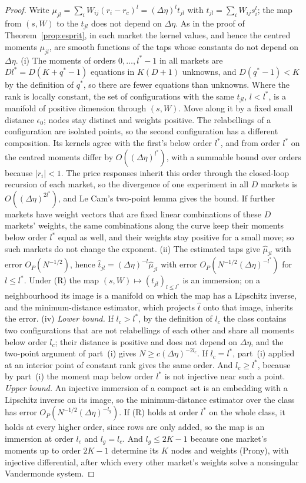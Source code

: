 \begin{proof}
Write $\mu_{jl}=\sum_iW_{ij}(r_i-r_c)^l=(\Delta\eta)^lt_{jl}$ with $t_{jl}=\sum_iW_{ij}s_i^l$; the map from $(s,W)$ to the $t_{jl}$ does not depend on $\Delta\eta$. As in the proof of Theorem~\ref{prop:esprit}, in each market the kernel values, and hence the centred moments $\mu_{jl}$, are smooth functions of the taps whose constants do not depend on $\Delta\eta$.
(i) The moments of orders $0,\ldots,l^*-1$ in all markets are $Dl^*=D(K+q^*-1)$ equations in $K(D+1)$ unknowns, and $D(q^*-1)<K$ by the definition of $q^*$, so there are fewer equations than unknowns. Where the rank is locally constant, the set of configurations with the same $t_{jl}$, $l<l^*$, is a manifold of positive dimension through $(s,W)$. Move along it by a fixed small distance $\epsilon_0$; nodes stay distinct and weights positive. The relabellings of a configuration are isolated points, so the second configuration has a different composition. Its kernels agree with the first's below order $l^*$, and from order $l^*$ on the centred moments differ by $O((\Delta\eta)^{l^*})$, with a summable bound over orders because $|r_i|<1$. The price responses inherit this order through the closed-loop recursion of each market, so the divergence of one experiment in all $D$ markets is $O((\Delta\eta)^{2l^*})$, and Le Cam's two-point lemma gives the bound. If further markets have weight vectors that are fixed linear combinations of these $D$ markets' weights, the same combinations along the curve keep their moments below order $l^*$ equal as well, and their weights stay positive for a small move; so such markets do not change the exponent.
(ii) The estimated taps give $\hat\mu_{jl}$ with error $O_P(N^{-1/2})$, hence $\hat t_{jl}=(\Delta\eta)^{-l}\hat\mu_{jl}$ with error $O_P(N^{-1/2}(\Delta\eta)^{-l^*})$ for $l\le l^*$. Under (R) the map $(s,W)\mapsto(t_{jl})_{l\le l^*}$ is an immersion; on a neighbourhood its image is a manifold on which the map has a Lipschitz inverse, and the minimum-distance estimator, which projects $\hat t$ onto that image, inherits the error.
(iv) \emph{Lower bound.} If $l_c>l^*$, by the definition of $l_c$ the class contains two configurations that are not relabellings of each other and share all moments below order $l_c$; their distance is positive and does not depend on $\Delta\eta$, and the two-point argument of part~(i) gives $N\ge c(\Delta\eta)^{-2l_c}$. If $l_c=l^*$, part~(i) applied at an interior point of constant rank gives the same order. And $l_c\ge l^*$, because by part~(i) the moment map below order $l^*$ is not injective near such a point. \emph{Upper bound.} An injective immersion of a compact set is an embedding with a Lipschitz inverse on its image, so the minimum-distance estimator over the class has error $O_P(N^{-1/2}(\Delta\eta)^{-l_g})$. If (R) holds at order $l^*$ on the whole class, it holds at every higher order, since rows are only added, so the map is an immersion at order $l_c$ and $l_g=l_c$. And $l_g\le2K-1$ because one market's moments up to order $2K-1$ determine its $K$ nodes and weights (Prony), with injective differential, after which every other market's weights solve a nonsingular Vandermonde system.

\end{proof}

